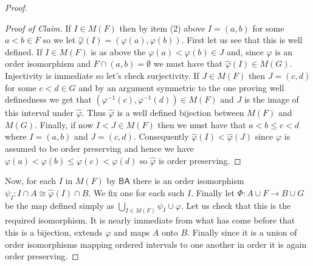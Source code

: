 \documentclass[10pt,a4paper]{amsart}
\def\BA{\mathsf{BA}}
\begin{document}
\begin{proof}
    \begin{proof}[Proof of Claim]
        If $I \in M(F)$ then by item (2) above $I = (a, b)$ for some $a < b \in F$ so we let $\hat{\varphi}(I) = (\varphi(a), \varphi(b))$. First let us see that this is well defined. If $I \in M(F)$ is as above the $\varphi(a) < \varphi(b) \in J$ and, since $\varphi$ is an order isomorphism and $F \cap (a, b)= \emptyset$ we must have that $\hat{\varphi}(I) \in M(G)$. Injectivity is immediate so let's check surjectivity. If $J \in M(F)$ then $J = (c, d)$ for some $c < d \in G$ and by an argument symmetric to the one proving well definedness we get that $(\varphi^{-1}(c), \varphi^{-1}(d)) \in M(F)$ and $J$ is the image of this interval under $\hat{\varphi}$. Thus $\hat{\varphi}$ is a well defined bijection between $M(F)$ and $M(G)$. Finally, if now $I < J \in M(F)$ then we must have that $a < b \leq c < d$ where $I = (a, b)$ and $J = (c, d)$. Consequently $\hat{\varphi}(I) < \hat{\varphi}(J)$ since $\varphi$ is assumed to be order preserving and hence we have $\varphi(a) < \varphi(b) \leq \varphi(c) < \varphi(d)$ so $\hat{\varphi}$ is order preserving.
    \end{proof}

Now, for each $I$ in $M(F)$ by $\BA$ there is an order isomorphism $\psi_I: I \cap A \cong \hat{\varphi}(I) \cap B$. We fix one for each such $I$. Finally let $\Phi:A \cup F \to B \cup G$ be the map defined simply as $\bigcup_{I \in M(F)}\psi_I \cup \varphi$. Let us check that this is the required isomorphism. It is nearly immediate from what has come before that this is a bijection, extends $\varphi$ and maps $A$ onto $B$. Finally since it is a union of order isomorphisms mapping ordered intervals to one another in order it is again order preserving. 
\end{proof}
\end{document}
